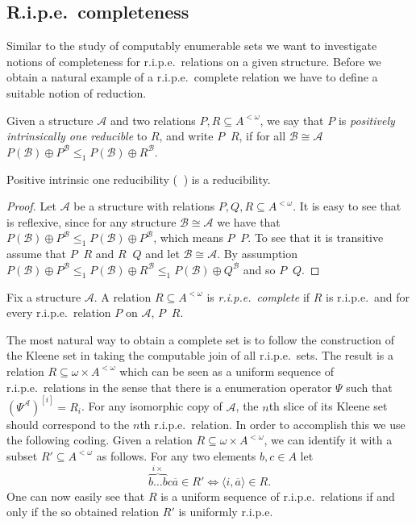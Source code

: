 \documentclass[11pt]{amsart}
\newcommand{\A}{{\mathcal{A}}}
\newcommand{\B}{{\mathcal{B}}}
\renewcommand{\bar}[1]{\overline{#1}}
\DeclareMathOperator{\redu}{\leq_{p1}}
\begin{document}
\subsection{R.i.p.e.\ completeness}
Similar to the study of computably enumerable sets we want to investigate notions of completeness for r.i.p.e.\ relations on a given structure. Before we obtain a natural example of a r.i.p.e.\ complete relation we have to define a suitable notion of reduction.
\begin{defn}
Given a structure $\A$ and two relations $P,R\subseteq A^{<\omega}$, we say that $P$ is \emph{positively intrinsically one reducible} to $R$, and write $P\redu R$, if for all $\B\cong \A$ $P(\B)\oplus P^\B\leq_1 P(\B)\oplus R^\B$.
\end{defn}
\begin{proposition}
    Positive intrinsic one reducibility ($\redu$) is a reducibility.
\end{proposition}
\begin{proof}
    Let $\A$ be a structure with relations $P, Q, R \subseteq A^{<\omega}$. It is easy to see that $\redu$ is reflexive, since for any structure $\B \cong \A$ we have that $P(\B) \oplus P^\B \leq_1 P(\B) \oplus P^\B$, which means $P \redu P$. To see that it is transitive assume that $P\redu R$ and $R \redu Q$ and let $\B \cong \A$. By assumption $P(\B) \oplus P^\B \leq_1 P(\B) \oplus R^\B \leq_1 P(\B) \oplus Q^\B$ and so $P \redu Q$.
\end{proof}
\begin{defn}
    Fix a structure $\A$. A relation $R\subseteq A^{<\omega}$ is \emph{r.i.p.e.\ complete} if $R$ is r.i.p.e.\ and for every r.i.p.e.\ relation $P$ on $\A$, $P\redu R$.
\end{defn}
The most natural way to obtain a complete set is to follow the construction of the Kleene set in taking the computable join of all r.i.p.e.\ sets. The result is a relation $R\subseteq \omega\times A^{<\omega}$ which can be seen as a uniform sequence of r.i.p.e.\ relations in the sense that there is a enumeration operator $\Psi$ such that $({\Psi^{\A}})^{[i]}=R_{i}$. %
For any isomorphic copy of $\A$, the $n$th slice of its Kleene set should correspond to the $n$th r.i.p.e.\ relation. In order to accomplish this we use the following coding.
Given a relation $R \subseteq \omega \times A^{<\omega}$, we can identify it with a subset $R'\subseteq A^{<\omega}$ as follows. For any two elements $b,c \in A$ let
\[
\overbrace{b\dots b}^{i\times}c\bar a \in R'\iff\langle i, \bar a \rangle \in R.  
\]
One can now easily see that $R$ is a uniform sequence of r.i.p.e.\ relations if and only if the so obtained relation $R'$ is uniformly r.i.p.e.
\end{document}
